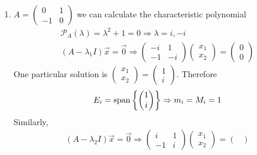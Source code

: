 \documentclass{article}
\numberwithin{equation}{section}
\begin{document}
\begin{eg}\leavevmode
    \begin{enumerate}
        \item $A = \begin{pmatrix}
            0 & 1 \\
            -1 & 0
        \end{pmatrix}$
        we can calculate the characteristic polynomial
        \begin{align*}
            \mathcal{P} _A(\lambda) = \lambda^2 + 1 = 0 \Rightarrow \lambda = i, -i  \\
            (A - \lambda_1 I)\vec x = \vec 0 \Rightarrow \begin{pmatrix}
                -i & 1 \\
                -1 & -i
            \end{pmatrix}
            \begin{pmatrix}
                x_1 \\ x_2
            \end{pmatrix}
            = \begin{pmatrix}
                0 \\ 0
            \end{pmatrix}
        \end{align*}
        One particular solution is $\begin{pmatrix}
            x_1 \\ x_2
        \end{pmatrix}=\begin{pmatrix}
            1 \\ i
        \end{pmatrix}$. Therefore
        \[
            E_{i} = \operatorname{span} \left\{ \begin{pmatrix}
                1 \\ i
            \end{pmatrix} \right\} \Rightarrow m_i = M_i = 1
        \]
        Similarly,
        \begin{align*}
            (A - \lambda_2 I)\vec x = \vec 0 \Rightarrow \begin{pmatrix}
                i & 1 \\
                -1 & i
            \end{pmatrix}
            \begin{pmatrix}
                x_1 \\ x_2
            \end{pmatrix}
            = \begin{pmatrix}

\end{pmatrix}
\end{align*}
\end{enumerate}
\end{eg}
\end{document}
